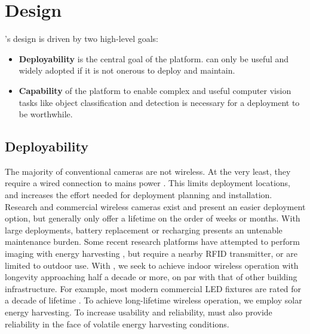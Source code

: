 \section{Design}

\name{}'s design is driven by two high-level goals:
\noindent
\begin{itemize}[leftmargin=*]
    \item \textbf{Deployability} is the central goal of the platform. \name can only be useful and widely adopted if it is not onerous to deploy and maintain.
    \item \textbf{Capability} of the platform to enable complex and useful computer vision tasks like object classification and detection is necessary for a deployment to be worthwhile.
\end{itemize}

\subsection{Deployability}
The majority of conventional cameras are not wireless. At the very least, they require a wired connection to mains power \cite{nestindoor}. This limits deployment locations, and increases the effort needed for deployment planning and installation. Research \cite{rahimi2005cyclops, rowe2007firefly, josephson2019wireless} and commercial \cite{blinkindoor,wyzeoutdoor} wireless cameras exist and present an easier deployment option, but generally only offer a lifetime on the order of weeks or months. With large deployments, battery replacement or recharging presents an untenable maintenance burden. Some recent research platforms have attempted to perform imaging with energy harvesting \cite{naderiparizi2015wispcam, nardello2019camaroptera}, but require a nearby RFID transmitter, or are limited to outdoor use. With \name, we seek to achieve indoor wireless operation with longevity approaching half a decade or more, on par with that of other building infrastructure. For example, most modern commercial LED fixtures are rated for a decade of lifetime \cite{en200715193,phillipstled}. To achieve long-lifetime wireless operation, we employ solar energy harvesting. To increase usability and reliability, \name must also provide reliability in the face of volatile energy harvesting conditions.

